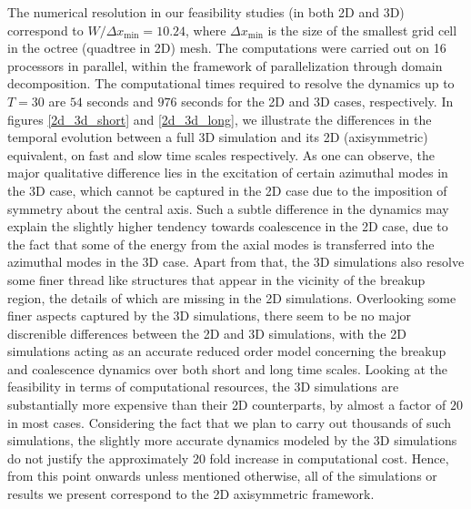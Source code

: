 The numerical resolution in our feasibility studies (in both 2D and 3D) correspond to 
$W / \Delta x_{\textrm{min}} = 10.24$, where $\Delta x_{\textrm{min}}$ is the size 
of the smallest grid cell in the octree (quadtree in 2D) mesh. 
The computations were carried out on 16 processors in parallel, within the framework
of parallelization through domain decomposition.
The computational times required to resolve the dynamics up to $T = 30$ are $54$ seconds 
and $976$ seconds for the 2D and 3D cases, respectively. 
In figures \ref{2d_3d_short} and \ref{2d_3d_long}, we illustrate the differences 
in the temporal evolution between a full 3D simulation and its 2D (axisymmetric)
equivalent, on fast and slow time scales respectively. 
As one can observe, the major qualitative difference 
lies in the excitation of certain azimuthal modes in the 3D case, 
which cannot be captured in the 2D case due to the 
imposition of symmetry about the central axis.
Such a subtle difference in the dynamics may 
explain the slightly higher tendency towards coalescence 
in the 2D case, due to the fact that some of the energy from 
the axial modes is transferred into the azimuthal modes in the 3D case. 
Apart from that, the 3D simulations also resolve some 
finer thread like structures that appear in the vicinity 
of the breakup region, the details of which are missing in the 2D simulations.  
Overlooking some finer aspects captured by the 3D simulations,  
there seem to be no major discrenible differences between the 2D and 3D simulations,
with the 2D simulations acting as an accurate reduced order model concerning the 
breakup and coalescence dynamics over both short and long time scales.
Looking at the feasibility in terms of computational resources, the 3D simulations 
are substantially more expensive than their 2D counterparts, by almost a factor of $20$ in most cases. 
Considering the fact that we plan to carry out thousands of such simulations, the 
slightly more accurate dynamics modeled by the 3D simulations do not justify the
approximately 20 fold increase in computational cost.   
Hence, from this point onwards unless mentioned otherwise, all of the 
simulations or results we present correspond to the 2D axisymmetric framework.



